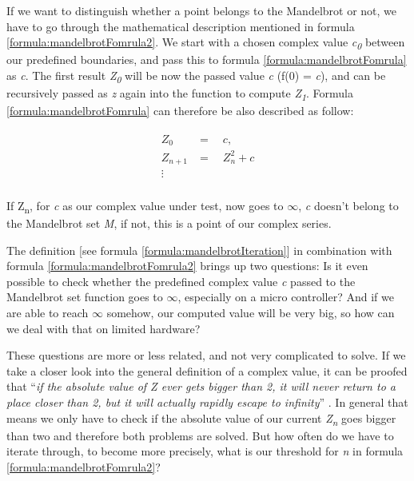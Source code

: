 \newpage

If we want to distinguish whether a point belongs to the Mandelbrot or not, we have to go through the mathematical description mentioned in formula \ref{formula:mandelbrotFomrula2}. We start with a chosen complex value \textit{c\textsubscript{0}} between our predefined boundaries, and pass this to formula \ref{formula:mandelbrotFomrula} as \textit{c}. The first result \textit{Z\textsubscript{0}} will be now the passed value \textit{c} (f(0) = \textit{c}), and can be recursively passed as \textit{z} again into the function to compute \textit{Z\textsubscript{1}}. Formula \ref{formula:mandelbrotFomrula} can therefore be also described as follow:

\begin{align} \label{formula:mandelbrotIteration}
	\begin{aligned}
		Z_0 \quad &= \quad c,\\
		Z_{n+1} &= \quad Z_n^2 + c\\
		\vdots
	\end{aligned}
\end{align}\\

\noindent If Z\textsubscript{n}, for \textit{c} as our complex value under test, now goes to $\infty$, \textit{c} doesn't belong to the Mandelbrot set \textit{M}, if not, this is a point of our complex series.

The definition [see formula \ref{formula:mandelbrotIteration}] in combination with formula \ref{formula:mandelbrotFomrula2} brings up two questions: Is it even possible to check whether the predefined complex value \textit{c} passed to the Mandelbrot set function goes to $\infty$, especially on a micro controller? And if we are able to reach $\infty$ somehow, our computed value will be very big, so how can we deal with that on limited hardware?

These questions are more or less related, and not very complicated to solve. If we take a closer look into the general definition of a complex value, it can be proofed that ``\textit{if the absolute value of Z ever gets bigger than 2, it will never return to a place closer than 2, but it will actually rapidly escape to infinity}'' \parencite{internet15}. In general that means we only have to check if the absolute value of our current \textit{Z\textsubscript{n}} goes bigger than two and therefore both problems are solved. But how often do we have to iterate through, to become more precisely, what is our threshold for \textit{n} in formula \ref{formula:mandelbrotFomrula2}?

